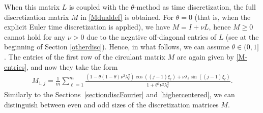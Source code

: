 \documentclass[a4paper]{article}
\begin{document}
When this matrix $L$ is coupled with the $\theta$-method as time discretization, the full discretization matrix $M$ in \eqref{Mdualdef} is obtained.  
For $\theta=0$ (that is, when the explicit Euler time discretization is applied), we have $M=I+\nu L$, hence $M\ge 0$ cannot hold for any $\nu>0$ due to the negative off-diagonal entries of $L$ (see at the beginning of Section \ref{otherdisc}). Hence, in what follows, we can assume $\theta\in(0,1]$.
The entries of the first row of the circulant matrix $M$ are again given by \eqref{M-entries}, and now %
they take the form
\begin{align}\label{eq51}
	M_{1,j}  = \frac{1}{m} \sum_{\ell=1}^{m} \frac{\left(1-\theta(1-\theta)\nu^2\lambda_\ell^2\right)
  \cos((j-1)\xi_\ell) + \nu\lambda_\ell\sin((j-1)\xi_\ell)}{1+\theta^2\nu^2\lambda_\ell^2}.
\end{align}
Similarly to the Sections~\ref{sectiondiscFourier} and \ref{highercentered}, we can distinguish between even and
odd sizes of the discretization matrices $M$.
\end{document}
